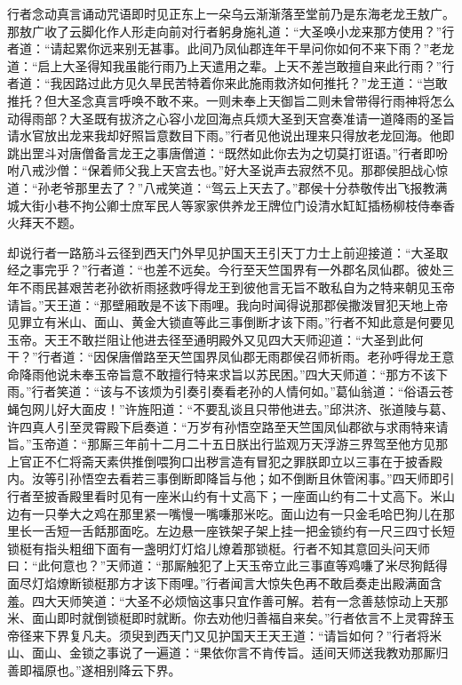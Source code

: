 \documentclass[12pt,UTF8]{ctexbook}
\begin{document}
{	行者念动真言诵动咒语即时见正东上一朵乌云渐渐落至堂前乃是东海老龙王敖广。那敖广收了云脚化作人形走向前对行者躬身施礼道：“大圣唤小龙来那方使用？”行者道：“请起累你远来别无甚事。此间乃凤仙郡连年干旱问你如何不来下雨？”老龙道：“启上大圣得知我虽能行雨乃上天遣用之辈。上天不差岂敢擅自来此行雨？”行者道：“我因路过此方见久旱民苦特着你来此施雨救济如何推托？”龙王道：“岂敢推托？但大圣念真言呼唤不敢不来。一则未奉上天御旨二则未曾带得行雨神将怎么动得雨部？大圣既有拔济之心容小龙回海点兵烦大圣到天宫奏准请一道降雨的圣旨请水官放出龙来我却好照旨意数目下雨。”行者见他说出理来只得放老龙回海。他即跳出罡斗对唐僧备言龙王之事唐僧道：“既然如此你去为之切莫打诳语。”行者即吩咐八戒沙僧：“保着师父我上天宫去也。”好大圣说声去寂然不见。那郡侯胆战心惊道：“孙老爷那里去了？”八戒笑道：“驾云上天去了。”郡侯十分恭敬传出飞报教满城大街小巷不拘公卿士庶军民人等家家供养龙王牌位门设清水缸缸插杨柳枝侍奉香火拜天不题。
	
	却说行者一路筋斗云径到西天门外早见护国天王引天丁力士上前迎接道：“大圣取经之事完乎？”行者道：“也差不远矣。今行至天竺国界有一外郡名凤仙郡。彼处三年不雨民甚艰苦老孙欲祈雨拯救呼得龙王到彼他言无旨不敢私自为之特来朝见玉帝请旨。”天王道：“那壁厢敢是不该下雨哩。我向时闻得说那郡侯撒泼冒犯天地上帝见罪立有米山、面山、黄金大锁直等此三事倒断才该下雨。”行者不知此意是何要见玉帝。天王不敢拦阻让他进去径至通明殿外又见四大天师迎道：“大圣到此何干？”行者道：“因保唐僧路至天竺国界凤仙郡无雨郡侯召师祈雨。老孙呼得龙王意命降雨他说未奉玉帝旨意不敢擅行特来求旨以苏民困。”四大天师道：“那方不该下雨。”行者笑道：“该与不该烦为引奏引奏看老孙的人情何如。”葛仙翁道：“俗语云苍蝇包网儿好大面皮！”许旌阳道：“不要乱谈且只带他进去。”邱洪济、张道陵与葛、许四真人引至灵霄殿下启奏道：“万岁有孙悟空路至天竺国凤仙郡欲与求雨特来请旨。”玉帝道：“那厮三年前十二月二十五日朕出行监观万天浮游三界驾至他方见那上官正不仁将斋天素供推倒喂狗口出秽言造有冒犯之罪朕即立以三事在于披香殿内。汝等引孙悟空去看若三事倒断即降旨与他；如不倒断且休管闲事。”四天师即引行者至披香殿里看时见有一座米山约有十丈高下；一座面山约有二十丈高下。米山边有一只拳大之鸡在那里紧一嘴慢一嘴嗛那米吃。面山边有一只金毛哈巴狗儿在那里长一舌短一舌餂那面吃。左边悬一座铁架子架上挂一把金锁约有一尺三四寸长短锁梃有指头粗细下面有一盏明灯灯焰儿燎着那锁梃。行者不知其意回头问天师曰：“此何意也？”天师道：“那厮触犯了上天玉帝立此三事直等鸡嗛了米尽狗餂得面尽灯焰燎断锁梃那方才该下雨哩。”行者闻言大惊失色再不敢启奏走出殿满面含羞。四大天师笑道：“大圣不必烦恼这事只宜作善可解。若有一念善慈惊动上天那米、面山即时就倒锁梃即时就断。你去劝他归善福自来矣。”行者依言不上灵霄辞玉帝径来下界复凡夫。须臾到西天门又见护国天王天王道：“请旨如何？”行者将米山、面山、金锁之事说了一遍道：“果依你言不肯传旨。适间天师送我教劝那厮归善即福原也。”遂相别降云下界。
	
}
\end{document}
